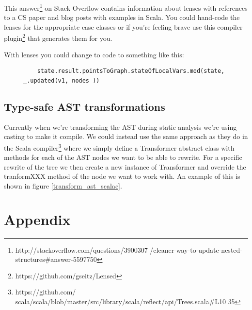 \documentclass[11pt]{exam}
\begin{document}
This answer\footnote{http://stackoverflow.com/questions/3900307
/cleaner-way-to-update-nested-structures\#answer-5597750}  on Stack
Overflow contains information about lenses with references to a CS
paper and blog posts with examples in Scala. You could hand-code the
lenses for the appropriate case classes or if you're feeling brave use
this compiler plugin\footnote{https://github.com/gseitz/Lensed} that
generates them for you. \newline

With lenses you could change to code to something like this:

\begin{figure}[h!]
  \begin{lstlisting}
    state.result.pointsToGraph.stateOfLocalVars.mod(state, _.updated(v1, nodes ))
  \end{lstlisting}
\end{figure}

\subsection{Type-safe AST transformations}

Currently when we're transforming the AST during static analysis we're
using casting to make it compile. We could instead use the same
approach as they do in the Scala compiler\footnote{https://github.com/
scala/scala/blob/master/src/library/scala/reflect/api/Trees.scala\#L10
35} where we simply define a Transformer abstract class with methods
for each of the AST nodes we want to be able to rewrite. For a
specific rewrite of the tree we then create a new instance of
Transformer and override the tranformXXX method of the node we want to
work with. An example of this is shown in figure
\ref{transform_ast_scalac}.

\section{Appendix}
\end{document}
